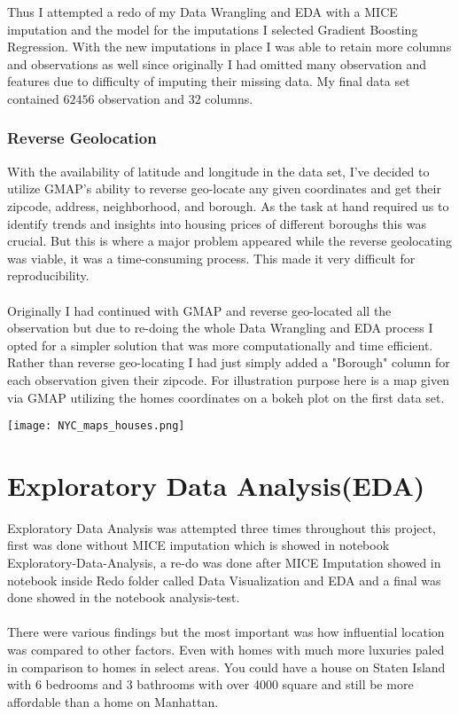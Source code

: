 \documentclass{article}
\begin{document}
\begin{titlepage}
    Thus I attempted a redo of my Data Wrangling and EDA with a MICE imputation and the model for the imputations I selected Gradient Boosting Regression. With the new imputations in place I was able to retain more columns and observations as well since originally I had omitted many observation and features due to difficulty of imputing their missing data. My final data set contained $62456$ observation and $32$ columns.
\subsubsection{Reverse Geolocation}
    With the availability of latitude and longitude in the data set, I've decided to utilize GMAP's ability to reverse geo-locate any given coordinates and get their zipcode, address, neighborhood, and borough. As the task at hand required us to identify trends and insights into housing prices of different boroughs this was crucial. But this is where a major problem appeared while the reverse geolocating was viable, it was a time-consuming process. This made it very difficult for reproducibility. \\
    \\
    Originally I had continued with GMAP and reverse geo-located all the observation but due to re-doing the whole Data Wrangling and EDA process I opted for a simpler solution that was more computationally and time efficient. Rather than reverse geo-locating I had just simply added a "Borough" column for each observation given their zipcode. For illustration purpose here is a map given via GMAP utilizing the homes coordinates on a bokeh plot on the first data set. \\
    \begin{center}
        \texttt{[image: NYC\_maps\_houses.png]}
    \end{center}


\section{Exploratory Data Analysis(EDA)}

Exploratory Data Analysis was attempted three times throughout this project, first was done without MICE imputation which is showed in notebook Exploratory-Data-Analysis, a re-do  was done after MICE Imputation showed in notebook inside Redo folder called Data Visualization and EDA and a final was done showed in the notebook analysis-test.\\
\\
There were various findings but the most important was how influential location was compared to other factors. Even with homes with much more luxuries paled in comparison to homes in select areas. You could have a house on Staten Island with 6 bedrooms and 3 bathrooms with over 4000 square and still be more affordable than a home on Manhattan. \\

\end{titlepage}
\end{document}
